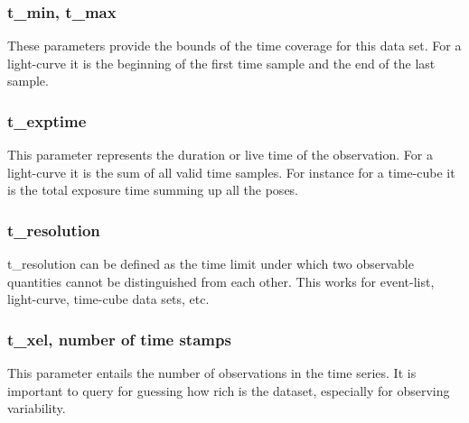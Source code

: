 \documentclass[11pt,a4paper]{ivoa}
\begin{document}
 \subsubsection{t\_min, t\_max}
 These parameters provide the bounds of the time coverage for this data set. For a light-curve it is the beginning of the first time sample and the end of the last sample.
  \subsubsection{t\_exptime}
  This parameter represents the duration or live time of the observation. 
  For a light-curve it is the sum of all valid time samples. For instance for a time-cube it is the total exposure time summing up all the poses.
  \subsubsection{t\_resolution}
  t\_resolution can be defined as the time limit under which two observable quantities cannot be distinguished from each other.
  This works for event-list, light-curve, time-cube data sets, etc. 
  \subsubsection{t\_xel, number of time stamps}
This parameter entails the number of observations in the time series. It is important to query for guessing how rich is the dataset, especially for observing variability.


\end{document}

